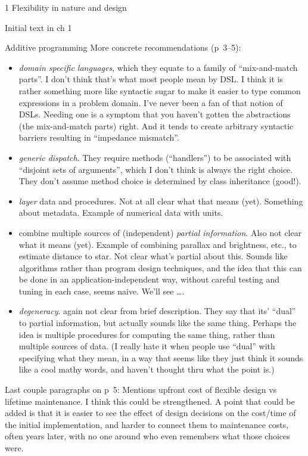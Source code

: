 \documentclass[12pt]{PalisadesLakesBook}
\begin{document}
\begin{plSection}{1 Flexibility in nature and design}
\begin{plSection}{Initial text in ch 1}
\begin{plSection}{Additive programming}
More concrete recommendations (p~3--5):
\begin{itemize}
  \item \emph{domain specific languages}, 
  which they equate to a family
  of ``mix-and-match parts''. I don't think that's 
  what most people mean by DSL. 
  I think it is rather something more like
  syntactic sugar to make it easier to type common expressions
  in a problem domain. I've never been a fan of that notion of
  DSLs. Needing one is a symptom that you haven't gotten the
  abstractions (the mix-and-match parts) right. And it tends
  to create arbitrary syntactic barriers resulting in 
  ``impedance mismatch''.
  \item \emph{generic dispatch}. They require methods (``handlers'')
  to be associated with ``disjoint sets of arguments'', 
  which I don't think is always the right choice.
  They don't assume method choice is determined by class
  inheritance (good!).
  \item \emph{layer} data and procedures. Not at all clear what 
  that means (yet). Something about metadata.
  Example of numerical data with units.  
  \item combine multiple sources of (independent) 
  \emph{partial information}. 
  Also not clear what it means (yet).
  Example of combining parallax and brightness, etc., to estimate
  distance to star. 
  Not clear what's partial about this.
  Sounds like algorithms rather than
  program design techniques, and the idea that this can be done
  in an application-independent way, without careful
  testing and tuning in each case, seems naive.
  We'll see {\ldots}.
  \item \emph{degeneracy}. again not clear from brief description.
  They say that its' ``dual'' to partial
  information, but actually sounds like the same thing.
  Perhaps the idea is multiple procedures for computing the same
  thing, rather than multiple sources of data.
  (I really hate it when people use ``dual'' with specifying
  what they mean, in a way that seems like they just
  think it sounds like a cool mathy words, 
  and haven't thought thru what the point is.)
\end{itemize}

Last couple paragraphs on p~5:
Mentions upfront cost of flexible design vs
lifetime maintenance.
I think this could be strengthened.
A point that could be added is that 
it is easier to see the effect of design decisions 
on the cost/time of the initial implementation,
and harder to connect them to maintenance costs, 
often years later, with no one around who even remembers 
what those choices were. 


\end{plSection}
\end{plSection}
\end{plSection}
\end{document}
